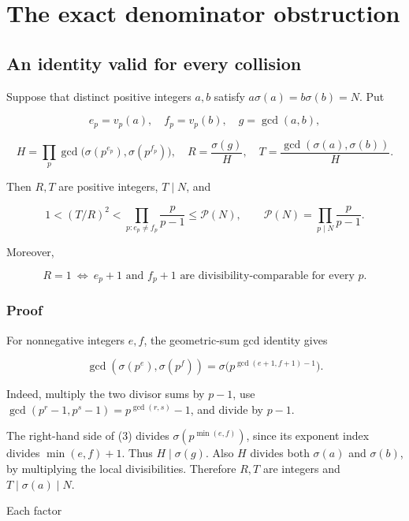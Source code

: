 \chapter{The exact denominator obstruction}\label{ch:ratio}
\section{An identity valid for every collision}\label{ratio:an-identity-valid-for-every-collision}

Suppose that distinct positive integers \(a,b\) satisfy \(a\sigma(a)=b\sigma(b)=N\). Put

\[
e_p=v_p(a),\quad f_p=v_p(b),\quad g=\gcd(a,b),
\]

\[
H=\prod_p\gcd\bigl(\sigma(p^{e_p}),\sigma(p^{f_p})\bigr),
\quad R=\frac{\sigma(g)}H,
\quad T=\frac{\gcd(\sigma(a),\sigma(b))}H.
\]

Then \(R,T\) are positive integers, \(T\mid N\), and

\[
\boxed{1<(T/R)^2<\prod_{p:e_p\ne f_p}\frac p{p-1}
\le\mathcal P(N),\qquad
\mathcal P(N)=\prod_{p\mid N}\frac p{p-1}.}
\tag{1}
\]

Moreover,

\[
\boxed{R=1\ \Longleftrightarrow\
e_p+1\text{ and }f_p+1\text{ are divisibility-comparable for every }p.}
\tag{2}
\]

\subsection{Proof}\label{ratio:proof}

For nonnegative integers \(e,f\), the geometric-sum gcd identity gives

\[
\gcd(\sigma(p^e),\sigma(p^f))
=\sigma\bigl(p^{\gcd(e+1,f+1)-1}\bigr).
\tag{3}
\]

Indeed, multiply the two divisor sums by \(p-1\), use \(\gcd(p^r-1,p^s-1)=p^{\gcd(r,s)}-1\), and divide by \(p-1\).

The right-hand side of (3) divides \(\sigma(p^{\min(e,f)})\), since its exponent index divides \(\min(e,f)+1\). Thus \(H\mid\sigma(g)\). Also \(H\) divides both \(\sigma(a)\) and \(\sigma(b)\), by multiplying the local divisibilities. Therefore \(R,T\) are integers and \(T\mid\sigma(a)\mid N\).

Each factor


